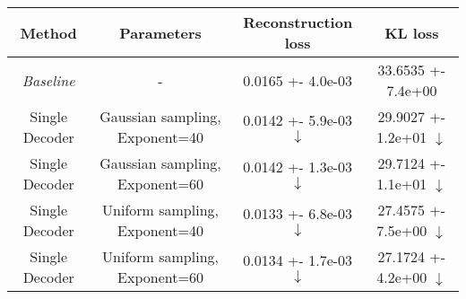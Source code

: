 \centering
\scriptsize
\begin{tabular}{||c|c|c|c||}
\hline
 Method & Parameters & Reconstruction loss & KL loss \\
\hline
\textit{Baseline} & - & 0.0165 +- 4.0e-03 & 33.6535 +- 7.4e+00 \\
\hline
Single Decoder & Gaussian sampling, Exponent=40 & 0.0142 +- 5.9e-03  \textbf{$\downarrow$} & 29.9027 +- 1.2e+01  \textbf{$\downarrow$} \\
\hline
Single Decoder & Gaussian sampling, Exponent=60 & 0.0142 +- 1.3e-03  \textbf{$\downarrow$} & 29.7124 +- 1.1e+01  \textbf{$\downarrow$} \\
\hline
Single Decoder & Uniform sampling, Exponent=40 & 0.0133 +- 6.8e-03  \textbf{$\downarrow$} & 27.4575 +- 7.5e+00  \textbf{$\downarrow$} \\
\hline
Single Decoder & Uniform sampling, Exponent=60 & 0.0134 +- 1.7e-03  \textbf{$\downarrow$} & 27.1724 +- 4.2e+00  \textbf{$\downarrow$} \\
\hline
\end{tabular}

